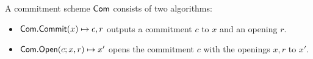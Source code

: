 %
%





\begin{definition}
	A commitment scheme $ \mathsf{Com} $ consists of two algorithms:
	\begin{itemize}
		\item $ \mathsf{Com}.\mathsf{Commit}(x) \mapsto c,r$ outputs a commitment $ c $ to $ x $ and  an opening $ r $.
		\item $ \mathsf{Com}.\mathsf{Open}(c;x,r)  \mapsto x'$ opens the commitment $ c $ with the openings $ x,r$ to $ x' $. 
	\end{itemize}
\end{definition}
